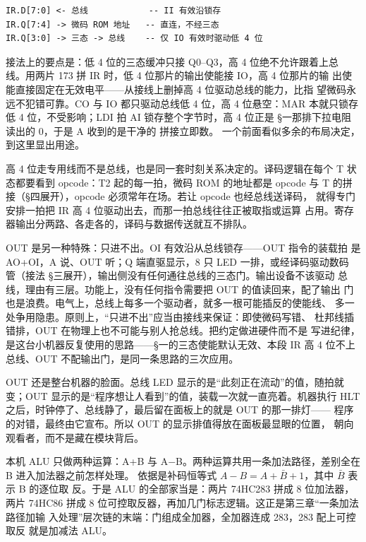 \begin{lstlisting}
IR.D[7:0] <- 总线            -- II 有效沿锁存
IR.Q[7:4] -> 微码 ROM 地址   -- 直连，不经三态
IR.Q[3:0] -> 三态 -> 总线    -- 仅 IO 有效时驱动低 4 位
\end{lstlisting}

接法上的要点是：低 4 位的三态缓冲只接 Q0--Q3，高 4 位绝不允许跟着上总
线。用两片 173 拼 IR 时，低 4 位那片的输出使能接 IO，高 4 位那片的输
出使能直接固定在无效电平——从接线上删掉高 4 位驱动总线的能力，比指
望微码永远不犯错可靠。CO 与 IO 都只驱动总线低 4 位，高 4 位悬空：MAR
本就只锁存低 4 位，不受影响；LDI 拍 AI 锁存整个字节时，高 4 位正是
§一那排下拉电阻读出的 0，于是 A 收到的是干净的  拼接立即数。
一个前面看似多余的布局决定，到这里显出用途。

高 4 位走专用线而不是总线，也是同一套时刻关系决定的。译码逻辑在每个
T 状态都要看到 opcode：T2 起的每一拍，微码 ROM 的地址都是 opcode 与 T
的拼接（§四展开），opcode 必须常年在场。若让 opcode 也经总线送译码，
就得专门安排一拍把 IR 高 4 位驱动出去，而那一拍总线往往正被取指或运算
占用。寄存器输出分两路、各走各的，译码与数据传送就互不排队。

OUT 是另一种特殊：只进不出。OI 有效沿从总线锁存——OUT 指令的装载拍
是 AO+OI，A 说、OUT 听；Q 端直驱显示，8 只 LED 一排，或经译码驱动数码
管（接法 §三展开），输出侧没有任何通往总线的三态门。输出设备不该驱动
总线，理由有三层。功能上，没有任何指令需要把 OUT 的值读回来，配了输出
门也是浪费。电气上，总线上每多一个驱动者，就多一根可能插反的使能线、
多一处争用隐患。原则上，“只进不出”应当由接线来保证：即使微码写错、
杜邦线插错排，OUT 在物理上也不可能与别人抢总线。把约定做进硬件而不是
写进纪律，是这台小机器反复使用的思路——§一的三态使能默认无效、本段
IR 高 4 位不上总线、OUT 不配输出门，是同一条思路的三次应用。

OUT 还是整台机器的脸面。总线 LED 显示的是“此刻正在流动”的值，随拍就
变；OUT 显示的是“程序想让人看到”的值，装载一次就一直亮着。机器执行
HLT 之后，时钟停了、总线静了，最后留在面板上的就是 OUT 的那一排灯——
程序的对错，最终由它宣布。所以 OUT 的显示排值得放在面板最显眼的位置，
朝向观看者，而不是藏在模块背后。

本机 ALU 只做两种运算：A+B 与
A$-$B。两种运算共用一条加法路径，差别全在 B 进入加法器之前怎样处理。
依据是补码恒等式 $A-B = A+\bar{B}+1$，其中 $\bar{B}$ 表示 B 的逐位取
反。于是 ALU 的全部家当是：两片 74HC283 拼成 8 位加法器，两片 74HC86
拼成 8 位可控取反器，再加几门标志逻辑。这正是第三章“一条加法路径加输
入处理”层次链的末端：门组成全加器，全加器连成 283，283 配上可控取反
就是加减法 ALU。

